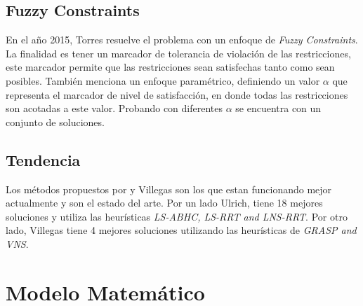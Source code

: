 \documentclass[letter, 10pt]{article}
\begin{document}
\subsection{Fuzzy Constraints}
En el año 2015, Torres \cite{Isis} resuelve el problema con un enfoque de \textit{Fuzzy Constraints}. La finalidad es tener un marcador de tolerancia de violación de las restricciones, este marcador permite que las restricciones sean satisfechas tanto como sean posibles. También menciona un enfoque paramétrico, definiendo un valor $\alpha$ que representa el marcador de nivel de satisfacción, en donde todas las restricciones son acotadas a este valor. Probando con diferentes $\alpha$ se encuentra con un conjunto de soluciones. 
\subsection{Tendencia}
Los métodos propuestos por \cite{Ulrich} y Villegas \cite{Villegas} son los que estan funcionando mejor actualmente y son el estado del arte. Por un lado Ulrich, tiene 18 mejores soluciones y utiliza las heurísticas \textit{LS-ABHC, LS-RRT and LNS-RRT}. Por otro lado, Villegas tiene 4 mejores soluciones utilizando las heurísticas de \textit{GRASP and VNS}. 
\newpage

\section{Modelo Matem\'atico}
\end{document}
